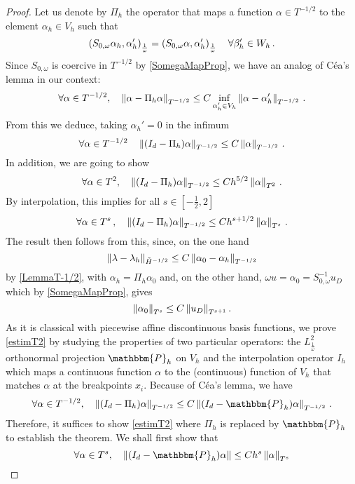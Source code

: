 \documentclass[a4paper]{article}
\begin{document}
\begin{proof}
Let us denote by $\Pi_h$ the operator that maps a function $\alpha \in T^{-1/2}$ to the element $\alpha_h \in V_h$ such that 
\[\left( S_{0,\omega}\alpha_h,\alpha_h'\right)_{\frac{1}{\omega}} = \left( S_{0,\omega} \alpha,\alpha_h'\right)_\frac{1}{\omega} \quad \forall \beta_h' \in W_h\,.\]	
Since $S_{0,\omega}$ is coercive in $T^{-1/2}$ by \autoref{SomegaMapProp}, we have an analog of Céa's lemma in our context: 
\begin{equation}
\forall \alpha \in T^{-1/2},\quad \left\|\alpha - \Pi_h \alpha\right\|_{T^{-1/2}} \leq C \inf_{\alpha_h' \in V_h } \left\|\alpha - \alpha'_h\right\|_{T^{-1/2}}\,.
\label{CeaAnalog}
\end{equation}
From this we deduce, taking $\alpha_h' = 0$ in the infimum 
\[\forall \alpha \in T^{-1/2}\quad \left\|(I_d - \Pi_h)\alpha\right\|_{T^{-1/2}} \leq C \left\|\alpha\right\|_{T^{-1/2}}\,.\]
In addition, we are going to show 
\begin{equation}
	\forall \alpha \in T^{2}, \quad \left\|(I_d - \Pi_h)\alpha\right\|_{T^{-1/2}} \leq C h^{5/2} \left\|\alpha\right\|_{T^{2}}\,.
	\label{estimT2}
\end{equation}
By interpolation, this implies for all $s \in \left[-\frac{1}{2},2\right]$
\[\forall \alpha \in T^s\,, \quad  \left\|(I_d - \Pi_h) \alpha\right\|_{T^{-1/2}} \leq C h^{s + 1/2} \left\|\alpha\right\|_{T^s}\,.\]
The result then follows from this, since, on the one hand
\[\left\|\lambda - \lambda_h\right\|_{\tilde{H}^{-1/2}} \leq C \left\|\alpha_0 - \alpha_h\right\|_{T^{-1/2}}\]
by \autoref{LemmaT-1/2}, with $\alpha_h = \Pi_h \alpha_0$ and, on the other hand, $\omega u = \alpha_0 = S_{0,\omega}^{-1} u_D$ which by \autoref{SomegaMapProp}, gives
\[\left\|\alpha_0\right\|_{T^s} \leq C\left\|u_D\right\|_{T^{s+1}}.\]
As it is classical with piecewise affine discontinuous basis functions, we prove \eqref{estimT2} by studying the properties of two particular operators: the $L^2_\frac{1}{\omega}$ orthonormal projection $\mathbbm{P}_h$ on $V_h$ and the interpolation operator $I_h$ which maps a continuous function $\alpha$ to the (continuous) function  of $V_h$ that matches $\alpha$ at the breakpoints $x_i$. Because of Céa's lemma, we have 
\[\forall \alpha \in T^{-1/2}, \quad \norm{(I_d - \Pi_h) \alpha}_{T^{-1/2}} \leq C \norm{(I_d - \mathbbm{P}_h) \alpha}_{T^{-1/2}} \,.\]
Therefore, it suffices to show \eqref{estimT2} where $\Pi_h$ is replaced by $\mathbbm{P}_h$ to establish the theorem. We shall first show that 
\begin{equation}
	\forall \alpha \in T^s, \quad \norm{(I_d - \mathbbm{P}_h)\alpha} \leq Ch^s \norm{\alpha}_{T^s}

\end{equation}
\end{proof}
\end{document}
